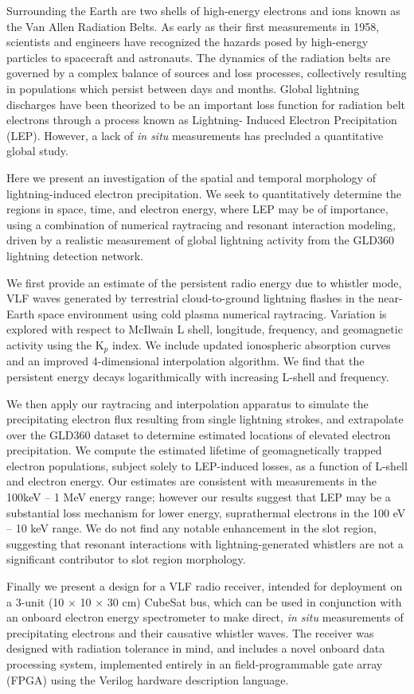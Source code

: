 Surrounding the Earth are two shells of high-energy electrons and ions known as the Van Allen Radiation Belts. As early as their first measurements in 1958, scientists and engineers have recognized the hazards posed by high-energy particles to spacecraft and astronauts. The dynamics of the radiation belts are governed by a complex balance of sources and loss processes, collectively resulting in populations which persist between days and months. Global lightning discharges have been theorized to be an important loss function for radiation belt electrons through a process known as Lightning- Induced Electron Precipitation (LEP). However, a lack of \emph{in situ} measurements has precluded a quantitative global study. 

Here we present an investigation of the spatial and temporal morphology of lightning-induced electron precipitation. We seek to quantitatively determine the regions in space, time, and electron energy, where LEP may be of importance, using a combination of numerical raytracing and resonant interaction modeling, driven by a realistic measurement of global lightning activity from the GLD360 lightning detection network.

We first provide an estimate of the persistent radio energy due to whistler mode, VLF waves generated by terrestrial cloud-to-ground lightning flashes in the near-Earth space environment using cold plasma numerical raytracing. Variation is explored with respect to McIlwain L shell, longitude, frequency, and geomagnetic activity using the K$_p$ index. We include updated ionospheric absorption curves and an improved 4-dimensional interpolation algorithm. We find that the persistent energy decays logarithmically with increasing L-shell and frequency.

We then apply our raytracing and interpolation apparatus to simulate the precipitating electron flux resulting from single lightning strokes, and extrapolate over the GLD360 dataset to determine estimated locations of elevated electron precipitation. We compute the estimated lifetime of geomagnetically trapped electron populations, subject solely to LEP-induced losses, as a function of L-shell and electron energy. Our estimates are consistent with measurements in the 100keV -- 1 MeV energy range; however our results suggest that LEP may be a substantial loss mechanism for lower energy, suprathermal electrons in the 100 eV -- 10 keV range. We do not find any notable enhancement in the slot region, suggesting that resonant interactions with lightning-generated whistlers are not a significant contributor to slot region morphology.

Finally we present a design for a VLF radio receiver, intended for deployment on a 3-unit (10 $\times$ 10 $\times$ 30 cm) CubeSat bus, which can be used in conjunction with an onboard electron energy spectrometer to make direct, \emph{in situ} measurements of precipitating electrons and their causative whistler waves. The receiver was designed with radiation tolerance in mind, and includes a novel onboard data processing system, implemented entirely in an field-programmable gate array (FPGA) using the Verilog hardware description language.